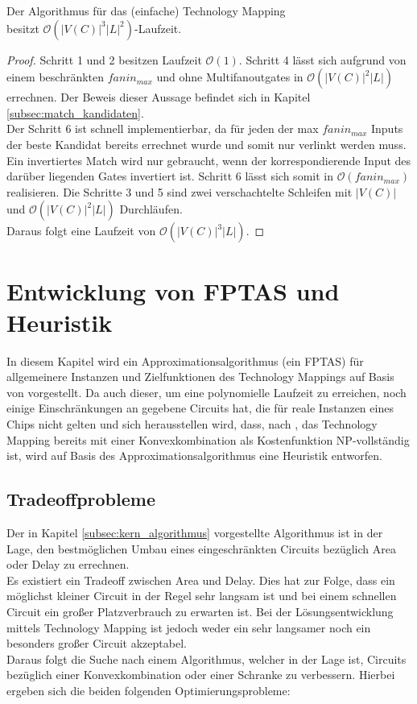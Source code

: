 \documentclass[11pt, a4paper, german]{article}
\newcommand{\TM}{Technology  Mapping }
\begin{document}
\begin{cor}{Der Algorithmus für das (einfache) \TM  \\ besitzt $\mathcal{O}(  |V(C)|^3|L|^2)$-Laufzeit.}
\end{cor}
\begin{proof}
Schritt 1 und 2 besitzen Laufzeit $\mathcal{O}(1)$. Schritt 4 lässt sich aufgrund von einem beschränkten $fanin_{max}$ und ohne Multifanoutgates in $\mathcal{O}(|V(C)|^2|L|)$ errechnen. Der Beweis dieser Aussage befindet sich in Kapitel \ref{subsec:match_kandidaten}.\\
Der Schritt 6 ist schnell implementierbar, da für jeden der max $fanin_{max}$ Inputs der beste Kandidat bereits errechnet wurde und somit nur verlinkt werden muss. Ein invertiertes Match wird nur gebraucht, wenn der korrespondierende Input des darüber liegenden Gates invertiert ist. Schritt 6 lässt sich somit in  $\mathcal{O}(fanin_{max})$ realisieren. Die Schritte 3 und 5 sind zwei verschachtelte Schleifen mit  $|V(C)|$ und $\mathcal{O}(|V(C)|^2|L|)$ Durchläufen. \\
Daraus folgt eine Laufzeit von $\mathcal{O}(  |V(C)|^3|L|)$.
\end{proof}



\section{Entwicklung von FPTAS und Heuristik}
\label{sec:allg_algorithmus}
In diesem Kapitel wird ein Approximationsalgorithmus (ein FPTAS) für allgemeinere Instanzen und Zielfunktionen des Technology Mappings auf Basis von \cite{Elbert} vorgestellt. Da auch dieser, um eine polynomielle Laufzeit zu erreichen, noch einige Einschränkungen an gegebene Circuits hat, die für reale Instanzen eines Chips nicht gelten und sich herausstellen wird, dass, nach \cite{ComplexitySynthesis}, das \TM bereits mit einer Konvexkombination als Kostenfunktion  NP-vollständig ist, wird auf Basis des Approximationsalgorithmus eine Heuristik entworfen.

\subsection{Tradeoffprobleme}
\label{subsec:tradeoffprobleme}
Der in Kapitel \ref{subsec:kern_algorithmus} vorgestellte Algorithmus ist in der Lage, den bestmöglichen Umbau eines eingeschränkten Circuits bezüglich Area oder Delay zu errechnen. \\
Es existiert  ein Tradeoff zwischen Area und Delay. Dies hat zur Folge, dass ein möglichst kleiner Circuit in der Regel sehr langsam ist und  bei einem schnellen Circuit ein großer Platzverbrauch zu erwarten ist. 
Bei der Lösungsentwicklung mittels \TM  ist jedoch weder ein sehr langsamer noch ein besonders großer Circuit akzeptabel.\\
Daraus folgt die Suche nach einem Algorithmus, welcher in der Lage ist, Circuits  bezüglich einer Konvexkombination oder einer Schranke zu verbessern. Hierbei ergeben sich die beiden folgenden Optimierungsprobleme: 
\end{document}
